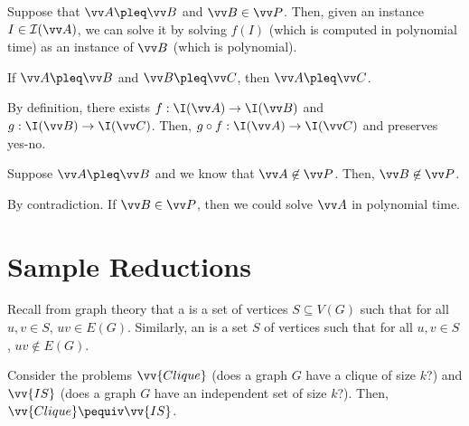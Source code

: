 Suppose that $\vv A \pleq \vv B$ and $\vv B \in \vv P$.
Then, given an instance $I \in \mathcal I(\vv A)$,
we can solve it by solving $f(I)$ (which is computed in polynomial time)
as an instance of $\vv B$ (which is polynomial).

\begin{lemma}
  If $\vv A \pleq \vv B$ and $\vv B \pleq \vv C$,
  then $\vv A \pleq \vv C$.
\end{lemma}
\begin{prf}
  By definition, there exists $f : \I(\vv A) \to \I(\vv B)$
  and $g : \I(\vv B) \to \I(\vv C)$.
  Then, $g \circ f : \I(\vv A) \to \I(\vv C)$ and preserves yes-no.
\end{prf}

\begin{lemma}
  Suppose $\vv A \pleq \vv B$ and we know that $\vv A \not\in \vv P$.
  Then, $\vv B \not\in \vv P$.
\end{lemma}
\begin{prf}
  By contradiction.
  If $\vv B \in \vv P$, then we could solve $\vv A$ in polynomial time.
\end{prf}

\section{Sample Reductions}

Recall from graph theory that a  is a set of vertices $S \subseteq V(G)$
such that for all $u, v \in S$, $uv \in E(G)$.
Similarly, an  is a set $S$ of vertices such that
for all $u, v \in S$, $uv \not\in E(G)$.

\begin{prop}
  Consider the problems $\vv{Clique}$ (does a graph $G$ have a clique of size $k$?)\@
  and $\vv{IS}$ (does a graph $G$ have an independent set of size $k$?).
  Then, $\vv{Clique} \pequiv \vv{IS}$.
\end{prop}
\begin{prf}

\end{prf}


